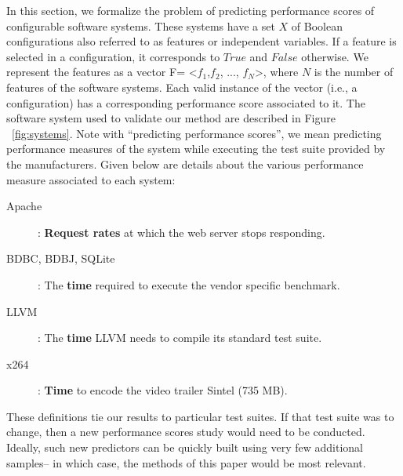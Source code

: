 \documentclass{sig-alternative}
\begin{document}
In this section, we formalize the problem of predicting performance scores of configurable software systems. These systems have a set $X$ of Boolean configurations  also referred to as features or independent variables. If a feature is selected in a configuration, it corresponds to $True$ and $False$ otherwise. We represent the features as a vector F= <$f_1$,$f_2$, ..., $f_N$>, where $N$ is the number of features of the software systems. Each valid instance of the vector (i.e., a configuration) has a corresponding performance score associated to it. The software system used to validate our method are described in Figure ~\ref{fig:systems}.
Note with ``predicting performance scores'', we 
mean predicting performance measures of the system while executing the test suite provided by the manufacturers. Given below are details about the various performance measure associated to  each system:
\begin{description}
\item[Apache]:  \textbf{Request rates} at which the web server stops responding. 
\item[BDBC, BDBJ, SQLite]: The \textbf{time} required to execute the vendor specific benchmark. 
\item[LLVM]: The \textbf{time} LLVM needs to compile its standard test suite. 
\item[x264]: \textbf{Time}   to encode the video trailer Sintel (735 MB). 
\end{description}

These definitions tie our results to particular test suites.
If that test suite was to change, then a  new
performance scores study would need  to be conducted. Ideally, such new predictors
can be quickly built using very few additional samples-- in which case, the methods
of this paper would be most relevant.

 
 
\end{document}
